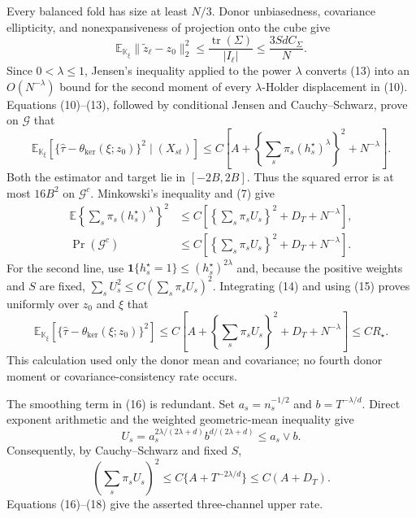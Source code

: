Every balanced fold has size at least \(N/3\).  Donor unbiasedness,
covariance ellipticity, and nonexpansiveness of projection onto the cube give
\[
 \mathbb E_{\mathbb K_\xi}
 \|\widetilde z_\ell-z_0\|_2^2
 \le \frac{\operatorname{tr}(\Sigma)}{|I_\ell|}
 \le\frac{3SdC_\Sigma}{N}.                                    \tag{13}
\]
Since \(0<\lambda\le1\), Jensen's inequality applied to the power
\(\lambda\) converts (13) into an \(O(N^{-\lambda})\) bound for the
second moment of every \(\lambda\)-Holder displacement in (10).  Equations
(10)--(13), followed by conditional Jensen and Cauchy--Schwarz, prove on
\(\mathcal G\) that
\[
 \mathbb E_{\mathbb K_\xi}
 [\{\widehat\tau-\theta_{\mathrm{ker}}(\xi;z_0)\}^2
   \mid(X_{st})]
 \le C\left[A+\left\{\sum_s\pi_s(h_s^\star)^\lambda\right\}^2
                  +N^{-\lambda}\right].                       \tag{14}
\]
Both the estimator and target lie in \([-2B,2B]\).  Thus the squared error
is at most \(16B^2\) on \(\mathcal G^c\).  Minkowski's inequality and (7)
give
\[
 \begin{split}
 \mathbb E\left\{\sum_s\pi_s(h_s^\star)^\lambda\right\}^2
 &\le C\left[\left\{\sum_s\pi_sU_s\right\}^2+D_T+N^{-\lambda}\right],\\
 \Pr(\mathcal G^c)
 &\le C\left[\left\{\sum_s\pi_sU_s\right\}^2+D_T+N^{-\lambda}\right].
                                                                    \tag{15}
 \end{split}
\]
For the second line, use \(\mathbf1\{h_s^\star=1\}\le
(h_s^\star)^{2\lambda}\) and, because the positive weights and \(S\) are
fixed, \(\sum_sU_s^2\le C(\sum_s\pi_sU_s)^2\).  Integrating (14) and using
(15) proves uniformly over \(z_0\) and \(\xi\) that
\[
 \mathbb E_{\mathbb K_\xi}
 [\{\widehat\tau-\theta_{\mathrm{ker}}(\xi;z_0)\}^2]
 \le C\left[A+\left\{\sum_s\pi_sU_s\right\}^2
                 +D_T+N^{-\lambda}\right]
 \le CR_\star.                                                \tag{16}
\]
This calculation used only the donor mean and covariance; no fourth donor
moment or covariance-consistency rate occurs.

The smoothing term in (16) is redundant.  Set
\(a_s=n_s^{-1/2}\) and \(b=T^{-\lambda/d}\).  Direct exponent arithmetic
and the weighted geometric-mean inequality give
\[
 U_s=a_s^{2\lambda/(2\lambda+d)}b^{d/(2\lambda+d)}
 \le a_s\vee b.                                                \tag{17}
\]
Consequently, by Cauchy--Schwarz and fixed \(S\),
\[
 \left(\sum_s\pi_sU_s\right)^2
 \le C\{A+T^{-2\lambda/d}\}
 \le C(A+D_T).                                                 \tag{18}
\]
Equations (16)--(18) give the asserted three-channel upper rate.

